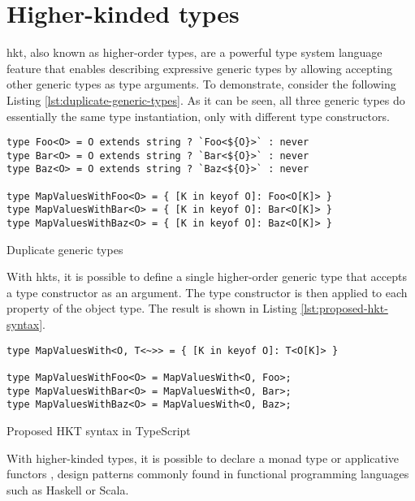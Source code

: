 \section{Higher-kinded types}\label{sec:higher-kinded-types}

\acrfull{hkt}, also known as higher-order types, are a powerful type system language feature that enables describing expressive generic types by allowing accepting other generic types as type arguments. To demonstrate, consider the following Listing \ref{lst:duplicate-generic-types}. As it can be seen, all three generic types do essentially the same type instantiation, only with different type constructors.

\begin{listing}[ht]
  \begin{verbatim}
type Foo<O> = O extends string ? `Foo<${O}>` : never
type Bar<O> = O extends string ? `Bar<${O}>` : never
type Baz<O> = O extends string ? `Baz<${O}>` : never

type MapValuesWithFoo<O> = { [K in keyof O]: Foo<O[K]> }
type MapValuesWithBar<O> = { [K in keyof O]: Bar<O[K]> }
type MapValuesWithBaz<O> = { [K in keyof O]: Baz<O[K]> }
\end{verbatim}
  \caption{Duplicate generic types}\label{lst:duplicate-generic-types}
\end{listing}

With \acrshort{hkt}s, it is possible to define a single higher-order generic type that accepts a type constructor as an argument. The type constructor is then applied to each property of the object type. The result is shown in Listing \ref{lst:proposed-hkt-syntax}.

\begin{listing}[ht]
  \begin{verbatim}
type MapValuesWith<O, T<~>> = { [K in keyof O]: T<O[K]> }

type MapValuesWithFoo<O> = MapValuesWith<O, Foo>;
type MapValuesWithBar<O> = MapValuesWith<O, Bar>;
type MapValuesWithBaz<O> = MapValuesWith<O, Baz>;
\end{verbatim}
  \caption{Proposed HKT syntax in TypeScript}\label{lst:proposed-hkt-syntax}
\end{listing}

With higher-kinded types, it is possible to declare a monad type \cite{wadlerMonadsFunctionalProgramming1993} or applicative functors \cite{mcbrideApplicativeProgrammingEffects2008}, design patterns commonly found in functional programming languages such as Haskell or Scala.

